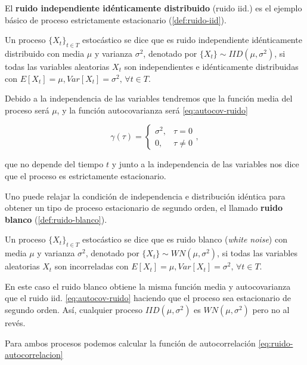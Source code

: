 El \textbf{ruido independiente idénticamente distribuido} (ruido iid.) es el ejemplo básico de proceso estrictamente estacionario (\autoref{def:ruido-iid}).

\begin{definicion}
  Un proceso $\{X_t\}_{t \in T}$ estocástico se dice que es ruido independiente idénticamente distribuido con media $\mu$ y varianza $\sigma^2$, denotado por $\{X_t\} \sim IID(\mu, \sigma^2)$, si todas las variables aleatorias $X_t$ son independientes e idénticamente distribuidas con $E[X_t] = \mu, Var[X_t] = \sigma^2, \, \forall t \in T$.
\label{def:ruido-iid}
\end{definicion}

Debido a la independencia de las variables tendremos que la función media del proceso será $\mu$, y la función autocovarianza será \eqref{eq:autocov-ruido}

\begin{equation}
  \gamma(\tau) =
  \begin{cases}
    \sigma^2, & \tau = 0 \\
    0, & \tau \neq 0
  \end{cases},
  \label{eq:autocov-ruido}
\end{equation}

que no depende del tiempo $t$ y junto a la independencia de las variables nos dice que el proceso es estrictamente estacionario.

Uno puede relajar la condición de independencia e distribución idéntica para obtener un tipo de proceso estacionario de segundo orden, el llamado \textbf{ruido blanco} (\autoref{def:ruido-blanco}).

\begin{definicion}
  Un proceso $\{X_t\}_{t \in T}$ estocástico se dice que es ruido blanco (\emph{white noise}) con media $\mu$ y varianza $\sigma^2$, denotado por $\{X_t\} \sim WN(\mu, \sigma^2)$, si todas las variables aleatorias $X_t$ son incorreladas con $E[X_t] = \mu, Var[X_t] = \sigma^2, \, \forall t \in T$.
\label{def:ruido-blanco}
\end{definicion}

En este caso el ruido blanco obtiene la misma función media y autocovarianza que el ruido iid. \eqref{eq:autocov-ruido} haciendo que el proceso sea estacionario de segundo orden. Así, cualquier proceso $IID(\mu, \sigma^2)$ es $WN(\mu, \sigma^2)$ pero no al revés.

Para ambos procesos podemos calcular la función de autocorrelación \eqref{eq:ruido-autocorrelacion}

